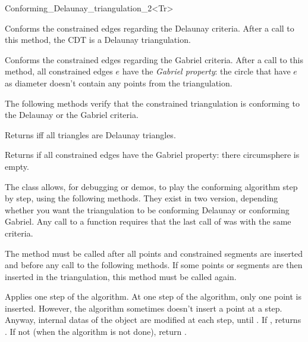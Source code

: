 \begin{ccRefClass}{Conforming_Delaunay_triangulation_2<Tr>}

{ Conforms the constrained edges regarding the Delaunay criteria.
  After a call to this method, the CDT is a Delaunay triangulation. }

{ Conforms the constrained edges regarding the Gabriel criteria. After
  a call to this method, all constrained edges $e$ have the
  \emph{Gabriel property}: the circle that have $e$ as diameter
  doesn't contain any points from the triangulation. }

The following methods verify that the constrained triangulation is
conforming to the Delaunay or the Gabriel criteria.

{ Returns  iff all triangles are Delaunay triangles. }

{ Returns  if all constrained edges have the Gabriel property:
  there circumsphere is empty. }

\begin{ccAdvanced}


The \ccRefName{} class allows, for debugging or demos, to play the
conforming algorithm step by step, using the following methods. They exist
in two version, depending whether you want the triangulation to be
conforming Delaunay or conforming Gabriel. Any call to a
 function requires that the last call of
 was with the same criteria.

         { The method must be called after all points and constrained
           segments are inserted and before any call to the following
           methods. If some points or segments are then inserted 
           in the triangulation, this method must be called again. }

         { Applies one step of the algorithm. At one step of the algorithm,
           only one point is inserted. However, the algorithm
           sometimes doesn't insert a point at a step. Anyway,
           internal datas of the \ccRefName{} object are modified at
           each step, until . If
           , returns . If not (when
           the algorithm is not done), return .}


\end{ccAdvanced}
\end{ccRefClass}
